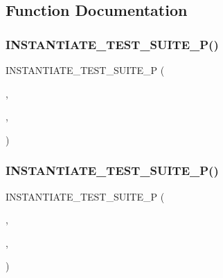 \subsection{Function Documentation}
\mbox{\label{_obj__test_2lib_2googletest-master_2googletest_2test_2googletest-test2__test_8cc_a9092fbc5f642e0be66474b214fae76c9}} 
\subsubsection{\texorpdfstring{INSTANTIATE\_TEST\_SUITE\_P()}{INSTANTIATE\_TEST\_SUITE\_P()}\hspace{0.1cm}{\footnotesize\ttfamily [1/2]}}
{\footnotesize\ttfamily I\+N\+S\+T\+A\+N\+T\+I\+A\+T\+E\+\_\+\+T\+E\+S\+T\+\_\+\+S\+U\+I\+T\+E\+\_\+P (\begin{DoxyParamCaption}\item[{Multiples\+Of33}]{,  }\item[{\mbox{\hyperlink{class_external_instantiation_test}{External\+Instantiation\+Test}}}]{,  }\item[{Values(33, 66)}]{ }\end{DoxyParamCaption})}

\mbox{\label{_obj__test_2lib_2googletest-master_2googletest_2test_2googletest-test2__test_8cc_a636f24ec7688ea5d70c09b8b73639e55}} 
\subsubsection{\texorpdfstring{INSTANTIATE\_TEST\_SUITE\_P()}{INSTANTIATE\_TEST\_SUITE\_P()}\hspace{0.1cm}{\footnotesize\ttfamily [2/2]}}
{\footnotesize\ttfamily I\+N\+S\+T\+A\+N\+T\+I\+A\+T\+E\+\_\+\+T\+E\+S\+T\+\_\+\+S\+U\+I\+T\+E\+\_\+P (\begin{DoxyParamCaption}\item[{Sequence2}]{,  }\item[{\mbox{\hyperlink{class_instantiation_in_multiple_translation_units_test}{Instantiation\+In\+Multiple\+Translation\+Units\+Test}}}]{,  }\item[{Values(42 $\ast$3, 42 $\ast$4, 42 $\ast$5)}]{ }\end{DoxyParamCaption})}




